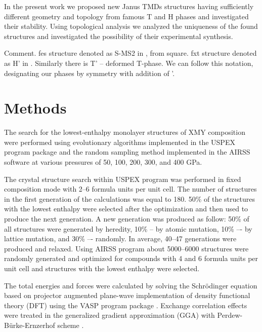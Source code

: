 \documentclass[a4paperm]{article}
\begin{document}
In the present work we proposed new Janus TMDs structures having sufficiently different geometry and topology from famous T and H phases and investigated their stability. Using topological analysis we analyzed the uniqueness of the found structures and investigated the possibility of their experimental synthesis.


Comment. 
fes structure denoted as S-MS2 in \cite{tang2021_smose}, from square.
fxt structure denoted as H' in \cite{ma2016_h'}.
Similarly there is T' – deformed T-phase.
We can follow this notation, designating our phases by symmetry with addition of '.

		\section{Methods}
The search for the lowest-enthalpy monolayer structures of XMY composition were performed using evolutionary algorithms implemented in the USPEX program package \cite{uspex1,uspex2,uspex3} and the random sampling method implemented in the AIRSS software \cite{airss1,airss2} at various pressures of 50, 100, 200, 300, and 400 GPa.


The crystal structure search within USPEX program was performed in fixed composition mode with 2--6 formula units per unit cell.
The number of structures in the first generation of the calculations was equal to 180.
50\% of the structures with the lowest enthalpy were selected after the optimization and then used to produce the next generation.
A new generation was produced as follow: 50\% of all structures were generated by heredity, 10\% -- by atomic mutation, 10\% –- by lattice mutation, and 30\% –- randomly.
In average, 40--47 generations were produced and relaxed.
Using AIRSS program about 5000--6000 structures were randomly generated and optimized for compounds with 4 and 6 formula units per unit cell and structures with the lowest enthalpy were selected.

The total energies and forces were calculated by solving the Schr\"{o}dinger equation based on projector augmented plane-wave implementation \cite{blochl1994projector} of density functional theory (DFT) using the VASP program package \cite{vasp1,vasp2}.
Exchange correlation effects were treated in the generalized gradient approximation (GGA) with Perdew-B\"{u}rke-Ernzerhof scheme \cite{pbe}.
\end{document}
